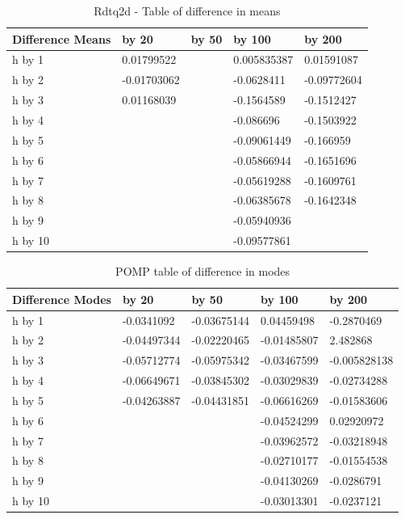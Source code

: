 \documentclass[a4paper,11pt]{article}
\begin{document}
\begin{table}[h]
\centering
\caption{Rdtq2d - Table of difference in means}
\begin{tabular}{|l|l|l|l|l|}
\hline
Difference Means & by 20       & by 50 & by 100      & by 200      \\ \hline
h by 1           & 0.01799522  &       & 0.005835387 & 0.01591087  \\ \hline
h by 2           & -0.01703062 &       & -0.0628411  & -0.09772604 \\ \hline
h by 3           & 0.01168039  &       & -0.1564589  & -0.1512427  \\ \hline
h by 4           &             &       & -0.086696   & -0.1503922  \\ \hline
h by 5           &             &       & -0.09061449 & -0.166959   \\ \hline
h by 6           &             &       & -0.05866944 & -0.1651696  \\ \hline
h by 7           &             &       & -0.05619288 & -0.1609761  \\ \hline
h by 8           &             &       & -0.06385678 & -0.1642348  \\ \hline
h by 9           &             &       & -0.05940936 &             \\ \hline
h by 10          &             &       & -0.09577861 &             \\ \hline
\end{tabular}
\end{table}


\begin{table}[h]
\centering
\caption{POMP table of difference in modes}
\begin{tabular}{|l|l|l|l|l|}
\hline
Difference Modes & by 20       & by 50       & by 100      & by 200       \\ \hline
h by 1           & -0.0341092  & -0.03675144 & 0.04459498  & -0.2870469   \\ \hline
h by 2           & -0.04497344 & -0.02220465 & -0.01485807 & 2.482868     \\ \hline
h by 3           & -0.05712774 & -0.05975342 & -0.03467599 & -0.005828138 \\ \hline
h by 4           & -0.06649671 & -0.03845302 & -0.03029839 & -0.02734288  \\ \hline
h by 5           & -0.04263887 & -0.04431851 & -0.06616269 & -0.01583606  \\ \hline
h by 6           &             &             & -0.04524299 & 0.02920972   \\ \hline
h by 7           &             &             & -0.03962572 & -0.03218948  \\ \hline
h by 8           &             &             & -0.02710177 & -0.01554538  \\ \hline
h by 9           &             &             & -0.04130269 & -0.0286791   \\ \hline
h by 10          &             &             & -0.03013301 & -0.0237121   \\ \hline
\end{tabular}
\end{table}
\end{document}

